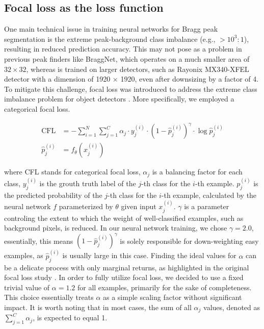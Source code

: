 \documentclass[a4paper]{article}
\begin{document}
\subsection{Focal loss as the loss function}

One main technical issue in training neural networks for Bragg peak segmentation
is the extreme peak-background class imbalance (e.g., $> 10^3 : 1$), resulting
in reduced prediction accuracy.  This may not pose as a problem in previous peak
finders like BraggNet, which operates on a much smaller area of $32 \times 32$,
whereas \peaknet{} is trained on larger detectors, such as Rayonix MX340-XFEL
detector with a dimension of 1920 $\times$ 1920, even after downsizing by a
factor of 4.  To mitigate this challenge, focal loss was introduced to address
the extreme class imbalance problem for object detectors
\citep{linFocalLossDense2018}.  More specifically, we employed a categorical
focal loss.

\begin{align}
\text{CFL} &= - \sum_{i = 1}^{N}\sum_{j = 1}^{C} 
            \alpha_j \cdot y_j^{(i)} \cdot (1-\hat{p}_j^{(i)})^\gamma 
            \cdot \log{\hat{p}_j^{(i)}} \\
\hat{p}_j^{(i)} &= f_\theta(x_j^{(i)})
\end{align}

where CFL stands for categorical focal loss, $\alpha_j$ is a balancing factor
for each class, $y_j^{(i)}$ is the grouth truth label of the $j$-th class for
the $i$-th example.  $p_j^{(i)}$ is the predicted probability of the $j$-th
class for the $i$-th example, calculated by the neural network $f$ parameterized
by $\theta$ given input $x_j^{(i)}$.  $\gamma$ is a parameter controling the
extent to which the weight of well-classified examples, such as background
pixels, is reduced.  In our neural network training, we chose $\gamma = 2.0$,
essentially, this means $(1-\hat{p} _j^{(i)}) ^\gamma$ is solely responsible for
down-weighting easy examples, as $\hat{p} _j^{(i)}$ is usually large in this
case.  Finding the ideal values for $\alpha$ can be a delicate process with only
marginal returns, as highlighted in the original focal loss study
\citep{linFocalLossDense2018}.  In order to fully utilize focal loss, we decided
to use a fixed trivial value of $\alpha = 1.2$ for all examples, primarily for
the sake of completeness.  This choice essentially treats $\alpha$ as a simple
scaling factor without significant impact.  It is worth noting that in most
cases, the sum of all $\alpha_j$ values, denoted as $\sum_{j = 1}^{C} \alpha_j$,
is expected to equal 1.
\end{document}
